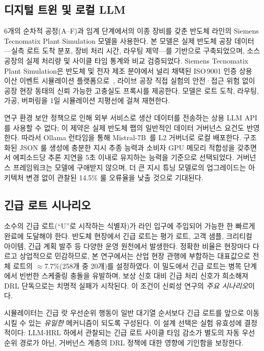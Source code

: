 \documentclass[10pt]{article}
\begin{document}
\subsection{디지털 트윈 및 로컬 LLM}
6개의 순차적 공정(A--F)과 임계 단계에서의 이종 장비를 갖춘 반도체 라인의
Siemens Tecnomatix Plant Simulation 모델을 사용한다.
본 모델은 실제 반도체 공장 데이터---실측 로트 도착 분포, 장비 처리 시간,
라우팅 제약---를 기반으로 구축되었으며, 소스 공장의 실제 처리량 및 사이클
타임 통계와 비교 검증되었다.
Siemens Tecnomatix Plant Simulation은 반도체 및 전자 제조 분야에서 널리 채택된
ISO\,9001 인증 상용 이산 이벤트 시뮬레이션 플랫폼으로~\cite{siemens2023tecnomatix},
라이브 공장 직접 실험의 안전·접근 위험 없이 공장 현장 동태의 신뢰 가능한
고충실도 프록시를 제공한다.
모델은 로트 도착, 라우팅, 가공, 버퍼링을 1일 시뮬레이션 지평선에 걸쳐 재현한다.

연구 환경 보안 정책으로 인해 외부 서비스로 생산 데이터를 전송하는 상용 LLM API를
사용할 수 없다; 이 제약은 실제 반도체 팹의 일반적인 데이터 거버넌스 요건도
반영한다. 따라서 Ollama 런타임을 통해 Mistral-7B~\cite{jiang2023}를 L2 거버너로 로컬 배포한다.
구조화된 JSON 룰 생성에 충분한 지시 추종 능력과 소비자 GPU 메모리 적합성을 갖추면서
에피소드당 추론 지연을 5초 이내로 유지하는 능력을 기준으로 선택되었다.
거버넌스 프레임워크는 모델에 구애받지 않으며, 더 큰 지시 튜닝 모델로의 업그레이드는
아키텍처 변경 없이 관찰된 14.5\% 룰 오류율을 낮출 것으로 기대된다.

\subsection{긴급 로트 시나리오}
\label{sec:urgentscenario}
소수의 긴급 로트(``U''로 시작하는 식별자)가 라인 입구에 주입되어 가능한 한
빠르게 완료에 도달해야 한다.
반도체 현장에서 긴급 로트는 평가 로트, 고객 샘플, 크리티컬 아이템, 긴급 계획
발주 등 다양한 운영 원천에서 발생한다. 정확한 비율은 현장마다 다르고 상업적으로
민감하므로, 본 연구에서는 산업 현장 관행에 부합하는 대표값으로 전체 로트의
$\approx$7.7\%(258개 중 20개)를 설정하였다.
이 밀도에서 긴급 로트는 병목 단계에서 빈번한 스케줄링 충돌을 유발하며,
보상 신호 대비 긴급 처리 신호가 희소해져 DRL 단독으로는 치명적 실패가
시작된다. 이 조건이 신뢰성 연구의 \emph{주요 시나리오}이다.

시뮬레이터는 긴급 랏 우선순위 행동이 일반 대기열 순서보다 긴급 로트를 앞으로 이동시킬 수 있는
\emph{유일한} 메커니즘이 되도록 구성된다. 이 설계 선택은 실험 유효성에 결정적이다:
LLM-HRL 하에서 관찰되는 긴급 로트 사이클 타임 감소가 별도의 자동 우선순위 경로가
아닌, 거버넌스 계층의 DRL 정책에 대한 영향에 기인함을 보장한다.
\end{document}
